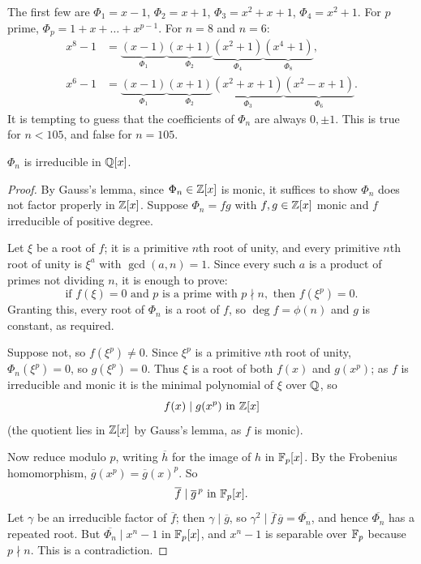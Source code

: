 \documentclass[a4paper]{scrartcl}
\begin{document}
\begin{example}
	The first few are $\Phi_1 = x-1$, $\Phi_2 = x+1$, $\Phi_3 = x^2+x+1$, $\Phi_4 = x^2+1$. For $p$ prime, $\Phi_p = 1 + x + \dots + x^{p-1}$. For $n = 8$ and $n=6$:
	\begin{align*}
		x^8-1 &= \underbrace{(x-1)}_{\Phi_1}\underbrace{(x+1)}_{\Phi_2}\underbrace{(x^2+1)}_{\Phi_4}\underbrace{(x^4+1)}_{\Phi_8},\\
		x^6-1 &= \underbrace{(x-1)}_{\Phi_1}\underbrace{(x+1)}_{\Phi_2}\underbrace{(x^2+x+1)}_{\Phi_3}\underbrace{(x^2-x+1)}_{\Phi_6}.
	\end{align*}
	It is tempting to guess that the coefficients of $\Phi_n$ are always $0, \pm1$. This is true for $n < 105$, and false for $n = 105$.
\end{example}

\begin{theorem}\label{thm:phiirred}
	$\Phi_n$ is irreducible in $\mathbb{Q}[x]$.
\end{theorem}

\begin{proof}
	By Gauss's lemma, since $\Phi_n \in \mathbb{Z}[x]$ is monic, it suffices to show $\Phi_n$ does not factor properly in $\mathbb{Z}[x]$. Suppose $\Phi_n = fg$ with $f, g \in \mathbb{Z}[x]$ monic and $f$ irreducible of positive degree.

	Let $\xi$ be a root of $f$; it is a primitive $n$th root of unity, and every primitive $n$th root of unity is $\xi^a$ with $\gcd(a,n)=1$. Since every such $a$ is a product of primes not dividing $n$, it is enough to prove:
	$$\text{if } f(\xi) = 0 \text{ and } p \text{ is a prime with } p \nmid n, \text{ then } f(\xi^p) = 0.$$
	Granting this, every root of $\Phi_n$ is a root of $f$, so $\deg f = \phi(n)$ and $g$ is constant, as required.

	Suppose not, so $f(\xi^p) \neq 0$. Since $\xi^p$ is a primitive $n$th root of unity, $\Phi_n(\xi^p) = 0$, so $g(\xi^p) = 0$. Thus $\xi$ is a root of both $f(x)$ and $g(x^p)$; as $f$ is irreducible and monic it is the minimal polynomial of $\xi$ over $\mathbb{Q}$, so
	$$f(x) \mid g(x^p) \text{ in } \mathbb{Z}[x]$$
	(the quotient lies in $\mathbb{Z}[x]$ by Gauss's lemma, as $f$ is monic).

	Now reduce modulo $p$, writing $\overline h$ for the image of $h$ in $\mathbb{F}_p[x]$. By the Frobenius homomorphism, $\overline g(x^p) = \overline g(x)^p$. So
	$$\overline f \mid \overline g^{\,p} \text{ in } \mathbb{F}_p[x].$$
	Let $\gamma$ be an irreducible factor of $\overline f$; then $\gamma \mid \overline g$, so $\gamma^2 \mid \overline f\, \overline g = \overline{\Phi_n}$, and hence $\overline{\Phi_n}$ has a repeated root. But $\overline{\Phi_n} \mid x^n-1$ in $\mathbb{F}_p[x]$, and $x^n-1$ is separable over $\mathbb{F}_p$ because $p \nmid n$. This is a contradiction.
\end{proof}
\end{document}
